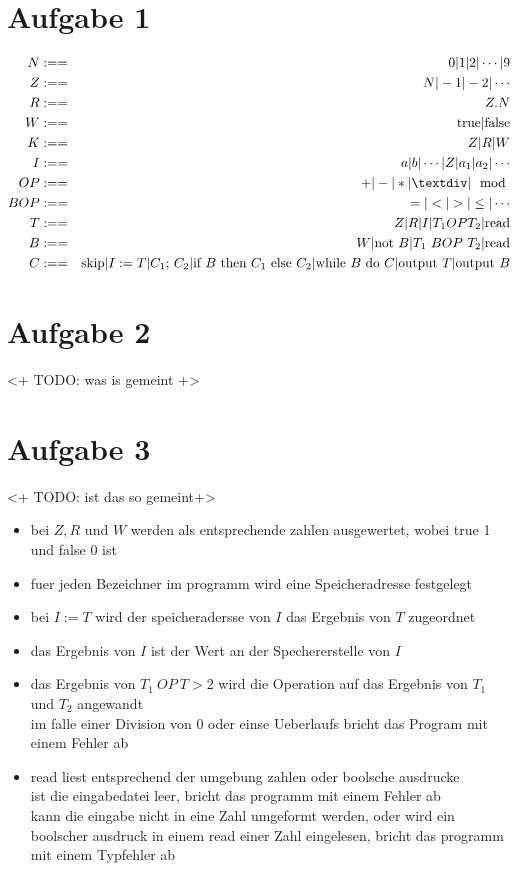 




\newcommand{\nr}{1}


\section*{Aufgabe 1}
\begin{eqnarray}
N &:==& 0 | 1 | 2 | \cdots | 9 \\
Z &:==& N | -1 | -2 | \cdots \\
R &:==& Z . N \\
W &:==& \text{true} | \text{false} \\
K &:==& Z | R | W \\
I &:==& a | b | \cdots | Z | a_1 | a_2 | \cdots \\
OP &:==& + | - | * | ÷ | \mod \\
BOP &:==& = | < | > | \leq | \cdots \\
T &:==& Z | R | I | T_1 OP T_2 | \text{read} \\
B &:==& W | \text{not $B$} | \text{$T_1$ $BOP$ $T_2$}  | \text{read}\\
C &:==& \text{skip} | I:=T | \text{$C_1$; $C_2$} | \text{if $B$ then $C_1$ else $C_2$} | 
        \text{while $B$ do $C$} | \text{output $T$} | \text{output $B$}
\end{eqnarray}

\section*{Aufgabe 2}
<+ TODO: was is gemeint +>

\section*{Aufgabe 3}
<+ TODO: ist das so gemeint+>
\begin{itemize}
\item bei $Z, R$ und $W$ werden als entsprechende zahlen ausgewertet, wobei true 1 und false 0 ist
\item fuer jeden Bezeichner im programm wird eine Speicheradresse festgelegt
\item bei $I:=T$ wird der speicheradersse von $I$ das Ergebnis von $T$ zugeordnet
\item das Ergebnis von $I$ ist der Wert an der Spechererstelle von $I$
\item das Ergebnis von $T_1\>OP\>T>2$ wird die Operation auf das Ergebnis von $T_1$ und $T_2$ angewandt
    \\ im falle einer Division von 0 oder einse Ueberlaufs bricht das Program mit einem Fehler ab
\item read liest entsprechend der umgebung zahlen oder boolsche ausdrucke
    \\ ist die eingabedatei leer, bricht das programm mit einem Fehler ab
    \\ kann die eingabe nicht in eine Zahl umgeformt werden, oder wird ein boolscher ausdruck in einem read einer Zahl eingelesen,
        bricht das programm mit einem Typfehler ab
\end{itemize}


